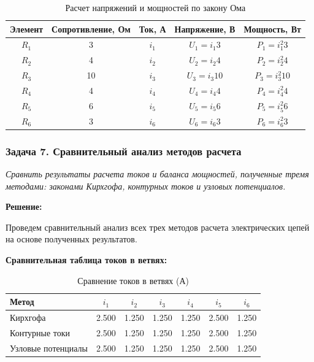 \begin{table}[H]
\centering
\begin{tabular}{|c|c|c|c|c|}
\hline
\textbf{Элемент} & \textbf{Сопротивление, Ом} & \textbf{Ток, А} & \textbf{Напряжение, В} & \textbf{Мощность, Вт} \\
\hline
$R_1$ & 3 & $i_1$ & $U_1 = i_1 3$ & $P_1 = i_1^2 3$ \\
\hline
$R_2$ & 4 & $i_2$ & $U_2 = i_2 4$ & $P_2 = i_2^2 4$ \\
\hline
$R_3$ & 10 & $i_3$ & $U_3 = i_3 10$ & $P_3 = i_3^2 10$ \\
\hline
$R_4$ & 4 & $i_4$ & $U_4 = i_4 4$ & $P_4 = i_4^2 4$ \\
\hline
$R_5$ & 6 & $i_5$ & $U_5 = i_5 6$ & $P_5 = i_5^2 6$ \\
\hline
$R_6$ & 3 & $i_6$ & $U_6 = i_6 3$ & $P_6 = i_6^2 3$ \\
\hline
\end{tabular}
\caption{Расчет напряжений и мощностей по закону Ома}
\label{tab:ohm_law_calculations}
\end{table}



\subsubsection{Задача 7. Сравнительный анализ методов расчета}
\textit{Сравнить результаты расчета токов и баланса мощностей, полученные тремя методами: законами Кирхгофа, контурных токов и узловых потенциалов.}

\textbf{Решение:}

Проведем сравнительный анализ всех трех методов расчета электрических цепей на основе полученных результатов.

\textbf{Сравнительная таблица токов в ветвях:}
\begin{table}[H]
\centering
\begin{tabular}{|l|c|c|c|c|c|c|}
\hline
\textbf{Метод} & $i_1$ & $i_2$ & $i_3$ & $i_4$ & $i_5$ & $i_6$ \\
\hline
Кирхгофа & 2.500 & 1.250 & 1.250 & 1.250 & 2.500 & 1.250 \\
\hline
Контурные токи & 2.500 & 1.250 & 1.250 & 1.250 & 2.500 & 1.250 \\
\hline
Узловые потенциалы & 2.500 & 1.250 & 1.250 & 1.250 & 2.500 & 1.250 \\
\hline
\end{tabular}
\caption{Сравнение токов в ветвях (А)}
\label{tab:currents_comparison}
\end{table}


